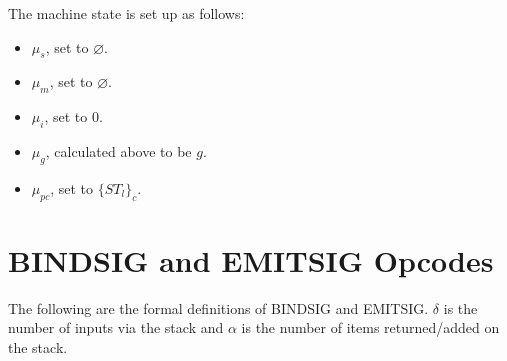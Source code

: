\documentclass{article}
\begin{document}
The machine state is set up as follows:
\begin{itemize}
    \item $\mu_s$, set to $\varnothing$.
    \item $\mu_m$, set to $\varnothing$.
    \item $\mu_i$, set to $0$.
    \item $\mu_g$, calculated above to be $g$.
    \item $\mu_{pc}$, set to $\{ST_l\}_c$.
\end{itemize}




\newpage
\section{BINDSIG and EMITSIG Opcodes}
The following are the formal definitions of BINDSIG and EMITSIG. $\delta$ is the number of inputs via the stack and $\alpha$ is the number of items returned/added on the stack. \\
\end{document}

